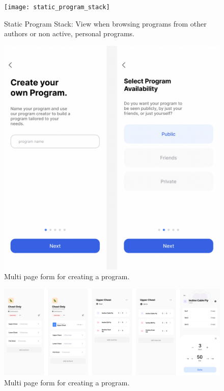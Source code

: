 \documentclass[12pt, titlepage]{article}
\begin{document}
  \begin{figure}[H]
		\centering
		\texttt{[image: static\_program\_stack]}
    \caption{Static Program Stack: View when browsing programs from other authors or non active, personal programs.}
	\end{figure}

  \begin{figure}[H]
		\centering
		\includegraphics[width=\linewidth,keepaspectratio]{create_program_form}
    \caption{Multi page form for creating a program.}
	\end{figure}

  \begin{figure}[H]
		\centering
		\includegraphics[width=\linewidth,keepaspectratio]{active_program_stack}
    \caption{Multi page form for creating a program.}
	\end{figure}
	
\end{document}
